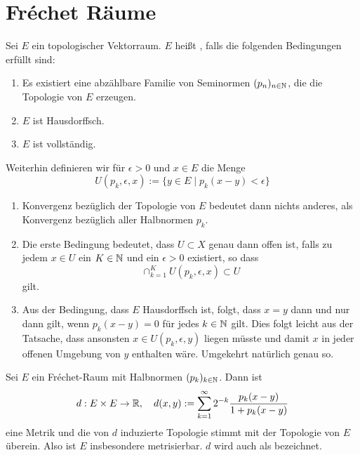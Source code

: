 
\section{Fr\'echet Räume}
\label{sec:frechet}

\begin{defin}
  \label{def:frechet}
  Sei $E$ ein topologischer Vektorraum. $E$ heißt
  , falls die folgenden Bedingungen erfüllt sind:
  \begin{enumerate}
  \item Es existiert eine abzählbare Familie von Seminormen $(p_n)_{n
      \in \mathbb{N}}$, die die Topologie von $E$ erzeugen.
  \item $E$ ist Hausdorffsch.
  \item $E$ ist vollständig.
  \end{enumerate}
  Weiterhin definieren wir für $\epsilon > 0$ und $x \in E$ die Menge
  \[
  U(p_k, \epsilon, x) := \{ y \in E \mid p_k(x-y) < \epsilon\}
  \]
\end{defin}


\begin{rem}
  \label{rem:frechet}
  \begin{enumerate}
  \item Konvergenz bezüglich der Topologie von $E$ bedeutet dann
    nichts anderes, als Konvergenz bezüglich aller Halbnormen $p_k$.
  \item Die erste Bedingung bedeutet, dass $U\subset X$ genau dann
    offen ist, falls zu jedem $x \in U$ ein $K \in \mathbb{N}$ und ein
    $\epsilon > 0$ existiert, so dass
    \[
    \cap_{k=1}^K U(p_k, \epsilon, x) \subset U
    \]
    gilt.
  \item Aus der Bedingung, dass $E$ Hausdorffsch ist, folgt, dass $x =
    y$ dann und nur dann gilt, wenn $p_k(x-y) = 0$ für jedes $k \in
    \mathbb{N}$ gilt. Dies folgt leicht aus der Tatsache, dass ansonsten $x
    \in U(p_k, \epsilon, y)$ liegen müsste und damit $x$ in jeder
    offenen Umgebung von $y$ enthalten wäre. Umgekehrt natürlich genau so.
  \end{enumerate}
\end{rem}

\begin{prop}
  \label{prop:frechet-metrik}
  Sei $E$ ein Fr\'echet-Raum mit Halbnormen $(p_k)_{k \in \mathbb{N}}$. Dann
  ist
  \[
  d: E \times E \rightarrow \mathbb{R}, \quad d(x,y) := \sum_{k=1}^\infty 2^{-k}
  \frac{p_k(x-y)}{1 + p_k(x-y)}
  \]
  eine Metrik und die von $d$ induzierte Topologie stimmt mit der
  Topologie von $E$ überein. Also ist $E$ insbesondere
  metrisierbar. $d$ wird auch als  bezeichnet.
\end{prop}

